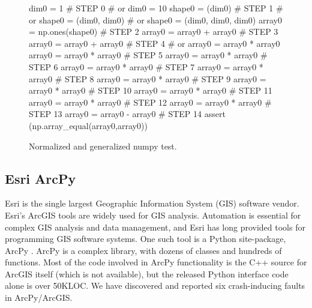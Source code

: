 \begin{figure}
{\scriptsize
\begin{code}
dim0 = 1                            \textcolor{black!60}{\# STEP 0}
\textcolor{black!60}{\#  or dim0 = 10 }
shape0 = (dim0)                     \textcolor{black!60}{\# STEP 1}
\textcolor{black!60}{\#  or shape0 = (dim0, dim0) }
\textcolor{black!60}{\#  or shape0 = (dim0, dim0, dim0) }
array0 = np.ones(shape0)            \textcolor{black!60}{\# STEP 2}
array0 = array0 + array0            \textcolor{black!60}{\# STEP 3}
array0 = array0 + array0            \textcolor{black!60}{\# STEP 4}
\textcolor{black!60}{\#  or array0 = array0 * array0 }
array0 = array0 * array0            \textcolor{black!60}{\# STEP 5}
array0 = array0 * array0            \textcolor{black!60}{\# STEP 6}
array0 = array0 * array0            \textcolor{black!60}{\# STEP 7}
array0 = array0 * array0            \textcolor{black!60}{\# STEP 8}
array0 = array0 * array0            \textcolor{black!60}{\# STEP 9}
array0 = array0 * array0            \textcolor{black!60}{\# STEP 10}
array0 = array0 * array0            \textcolor{black!60}{\# STEP 11}
array0 = array0 * array0            \textcolor{black!60}{\# STEP 12}
array0 = array0 * array0            \textcolor{black!60}{\# STEP 13}
array0 = array0 - array0            \textcolor{black!60}{\# STEP 14}
assert (np.array\_equal(array0,array0))
\end{code}
}
\caption{Normalized and generalized numpy test.}
\label{numpynormgen}
\end{figure}

\subsection{Esri ArcPy}

Esri is the single
largest Geographic Information System (GIS) software vendor.  Esri's ArcGIS tools are widely
used for GIS analysis.  Automation is essential for complex GIS analysis and
data management, and Esri has long provided tools
for programming GIS software systems.  One such tool
is a Python site-package, ArcPy \cite{ArcPy}.  ArcPy is a complex library,
with dozens of classes and hundreds of functions.  Most of the code involved in ArcPy
functionality is the C++ source for ArcGIS itself (which is not
available), but the released Python interface code alone is over 50KLOC.
We have  discovered and reported six crash-inducing faults in
ArcPy/ArcGIS.  


